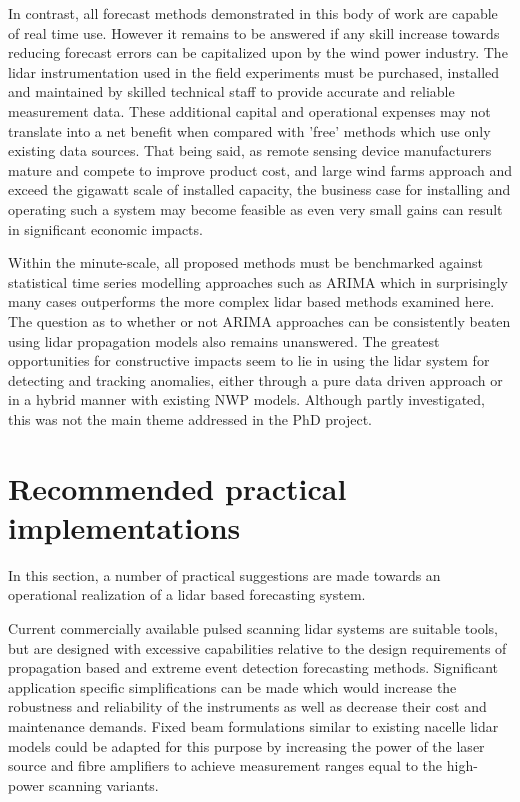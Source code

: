 In contrast, all forecast methods demonstrated in this body of work are capable of real time use. However it remains to be answered if any skill increase towards reducing forecast errors can be capitalized upon by the wind power industry. The lidar instrumentation used in the field experiments must be purchased, installed and maintained by skilled technical staff to provide accurate and reliable measurement data. These additional capital and operational expenses may not translate into a net benefit when compared with 'free' methods which use only existing data sources. That being said, as remote sensing device manufacturers mature and compete to improve product cost, and large wind farms approach and exceed the gigawatt scale of installed capacity, the business case for installing and operating such a system may become feasible as even very small gains can result in significant economic impacts.

Within the minute-scale, all proposed methods must be benchmarked against statistical time series modelling approaches such as ARIMA which in surprisingly many cases outperforms the more complex lidar based methods examined here. The question as to whether or not ARIMA approaches can be consistently beaten using lidar propagation models also remains unanswered. The greatest opportunities for constructive impacts seem to lie in using the lidar system for detecting and tracking anomalies, either through a pure data driven approach or in a hybrid manner with existing NWP models. Although partly investigated, this was not the main theme addressed in the PhD project.

\clearpage
\section{Recommended practical implementations}
\label{sec:discussion_practical}

In this section, a number of practical suggestions are made towards an operational realization of a lidar based forecasting system.

Current commercially available pulsed scanning lidar systems are suitable tools, but are designed with excessive capabilities relative to the design requirements of propagation based and extreme event detection forecasting methods. Significant application specific simplifications can be made which would increase the robustness and reliability of the instruments as well as decrease their cost and maintenance demands. Fixed beam formulations similar to existing nacelle lidar models could be adapted for this purpose by increasing the power of the laser source and fibre amplifiers to achieve measurement ranges equal to the high-power scanning variants. 

